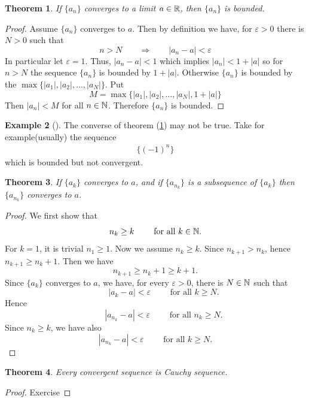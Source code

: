 \documentclass[	DIV=calc,paper=a4,fontsize=11pt]{scrartcl}	 	%
\newtheorem{thm}{Theorem}[section]
\theoremstyle{definition}
\newtheorem{exmp}[thm]{Example}
\theoremstyle{plain}
\theoremstyle{remark}
\begin{document}
\begin{thm}\label{covergbound}
If $\{a_n\}$ converges to a limit $a\in \Bbb R$, then $\{a_n\}$ is bounded.
\end{thm}

\begin{proof}
Assume $\{a_n\}$ converges to $a$. Then by definition we have, for $\varepsilon>0$ there is $N>0$ such that \\
\[n>N\qquad \Rightarrow \qquad |a_n-a|<\varepsilon\]
In particular let $\varepsilon=1.$ Thus, $|a_n-a|<1$ which implies $|a_n|<1+|a|$ so for $n>N$ the sequence $\{a_n\}$ is bounded by $1+|a|$. Otherwise $\{a_n\}$ is bounded by the $\max\{|a_1|,|a_2|,\ldots,|a_N|\}$. Put
\[M=\max\{|a_1|,|a_2|,\ldots,|a_N|,1+|a|\}\]
Then $|a_n|<M$ for all $n\in \Bbb N$. Therefore $\{a_n\}$ is bounded.
\end{proof}
\begin{exmp}[]
The converse of theorem (\ref{covergbound}) may not be true. Take for example(usually) the sequence
\begin{align*}
\{(-1)^n\}
\end{align*}
which is bounded but not convergent.
\end{exmp}

\begin{thm}
If $\{a_k\}$ converges to $a$, and if $\{a_{n_k}\}$ is a subsequence of $\{a_k\}$ then $\{a_{n_k}\}$ converges to $a$.
\end{thm}

\begin{proof}
We first show that
\[n_k\geq k\qquad \text{ for all } k\in\Bbb N.\]
For $k=1$, it is trivial $n_1\geq 1$. Now we assume $n_k\geq k$. Since $n_{k+1}>n_k$, hence $n_{k+1}\geq n_k+1$. Then we have
\[n_{k+1}\geq n_k+1\geq k+1.\]
Since $\{a_k\}$ converges to $a$, we have, for every $\varepsilon>0$, there is $N\in \Bbb N$ such that
\[\qquad |a_k-a|<\varepsilon\qquad \text{ for all } k\geq N.\]
Hence
\[\qquad |a_{n_k}-a|<\varepsilon \qquad \text{ for all }n_k\geq N.\]
Since $n_k\geq k$, we have also
\[|a_{n_k}-a|<\varepsilon \qquad \text{ for all }k \geq N.\]

\end{proof}

\begin{thm}
Every convergent sequence is Cauchy sequence.
\end{thm}

\begin{proof}
Exercise
\end{proof}
\end{document}
